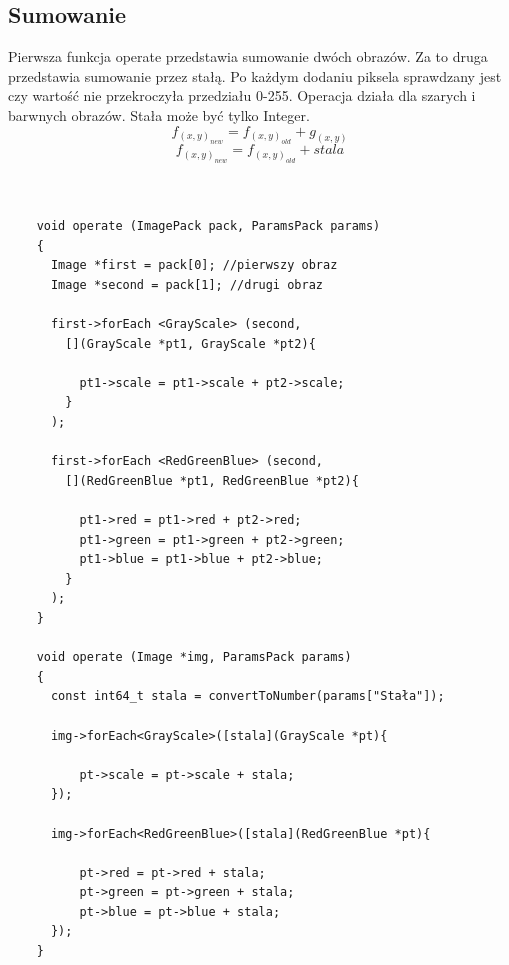 \documentclass{article}
\begin{document}
\subsection{Sumowanie}
Pierwsza funkcja operate przedstawia sumowanie dwóch obrazów. Za to druga przedstawia sumowanie przez stałą. Po każdym dodaniu piksela sprawdzany jest czy wartość nie przekroczyła przedziału 0-255. Operacja działa dla szarych i barwnych obrazów. Stała może być tylko Integer.
\begin{equation*}
f_(x,y)_{new} = f_(x,y)_{old}+g_(x,y)
\end{equation*}
\begin{equation*}
f_(x,y)_{new} = f_(x,y)_{old}+stala
\end{equation*}\\
\begin{Verbatim}[frame=single,label=Sumowanie (Source Code)]

    void operate (ImagePack pack, ParamsPack params)
    {
      Image *first = pack[0]; //pierwszy obraz
      Image *second = pack[1]; //drugi obraz

      first->forEach <GrayScale> (second,
        [](GrayScale *pt1, GrayScale *pt2){
        
          pt1->scale = pt1->scale + pt2->scale;
        }
      );

      first->forEach <RedGreenBlue> (second,
        [](RedGreenBlue *pt1, RedGreenBlue *pt2){
        
          pt1->red = pt1->red + pt2->red;
          pt1->green = pt1->green + pt2->green;
          pt1->blue = pt1->blue + pt2->blue;
        }
      );
    } 
    
    void operate (Image *img, ParamsPack params)
    {
      const int64_t stala = convertToNumber(params["Stała"]);

      img->forEach<GrayScale>([stala](GrayScale *pt){
      
          pt->scale = pt->scale + stala;
      });

      img->forEach<RedGreenBlue>([stala](RedGreenBlue *pt){
      
          pt->red = pt->red + stala;
          pt->green = pt->green + stala;
          pt->blue = pt->blue + stala;
      });
    }
       
\end{Verbatim}
\end{document}
